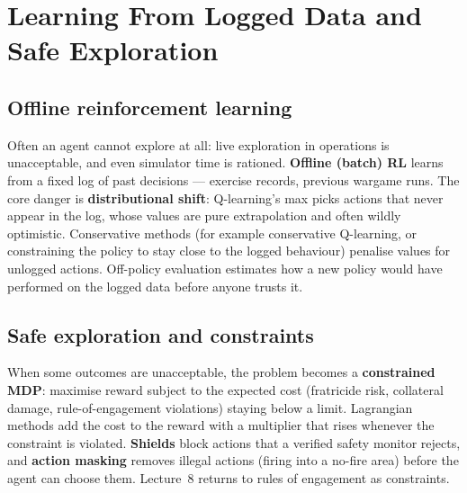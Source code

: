 \documentclass[11pt]{article}
\begin{document}
\section{Learning From Logged Data and Safe Exploration}
\subsection{Offline reinforcement learning}
Often an agent cannot explore at all: live exploration in operations is unacceptable, and even simulator time is rationed. \textbf{Offline (batch) RL} learns from a fixed log of past decisions --- exercise records, previous wargame runs. The core danger is \textbf{distributional shift}: Q-learning's max picks actions that never appear in the log, whose values are pure extrapolation and often wildly optimistic. Conservative methods (for example conservative Q-learning, or constraining the policy to stay close to the logged behaviour) penalise values for unlogged actions. Off-policy evaluation estimates how a new policy would have performed on the logged data before anyone trusts it.
\subsection{Safe exploration and constraints}
When some outcomes are unacceptable, the problem becomes a \textbf{constrained MDP}: maximise reward subject to the expected cost (fratricide risk, collateral damage, rule-of-engagement violations) staying below a limit. Lagrangian methods add the cost to the reward with a multiplier that rises whenever the constraint is violated. \textbf{Shields} block actions that a verified safety monitor rejects, and \textbf{action masking} removes illegal actions (firing into a no-fire area) before the agent can choose them. Lecture~8 returns to rules of engagement as constraints.
\end{document}
